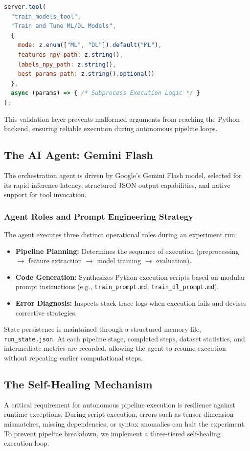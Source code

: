 \documentclass[conference]{IEEEtran}
\begin{document}
\begin{lstlisting}[language=JavaScript, caption={Zod Schema Validation for Modular Training Tool}]
server.tool(
  "train_models_tool",
  "Train and Tune ML/DL Models",
  {
    mode: z.enum(["ML", "DL"]).default("ML"),
    features_npy_path: z.string(),
    labels_npy_path: z.string(),
    best_params_path: z.string().optional()
  },
  async (params) => { /* Subprocess Execution Logic */ }
);
\end{lstlisting}

This validation layer prevents malformed arguments from reaching the Python backend, ensuring reliable execution during autonomous pipeline loops.

\subsection{The AI Agent: Gemini Flash}
The orchestration agent is driven by Google's Gemini Flash model, selected for its rapid inference latency, structured JSON output capabilities, and native support for tool invocation.

\subsubsection{Agent Roles and Prompt Engineering Strategy}
The agent executes three distinct operational roles during an experiment run:
\begin{itemize}
    \item \textbf{Pipeline Planning:} Determines the sequence of execution (preprocessing $\rightarrow$ feature extraction $\rightarrow$ model training $\rightarrow$ evaluation).
    \item \textbf{Code Generation:} Synthesizes Python execution scripts based on modular prompt instructions (e.g., \texttt{train\_prompt.md}, \texttt{train\_dl\_prompt.md}).
    \item \textbf{Error Diagnosis:} Inspects stack trace logs when execution fails and devises corrective strategies.
\end{itemize}

State persistence is maintained through a structured memory file, \texttt{run\_state.json}. At each pipeline stage, completed steps, dataset statistics, and intermediate metrics are recorded, allowing the agent to resume execution without repeating earlier computational steps.

\subsection{The Self-Healing Mechanism}
A critical requirement for autonomous pipeline execution is resilience against runtime exceptions. During script execution, errors such as tensor dimension mismatches, missing dependencies, or syntax anomalies can halt the experiment. To prevent pipeline breakdown, we implement a three-tiered self-healing execution loop.
\end{document}
